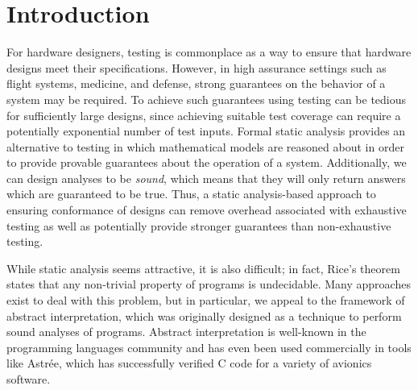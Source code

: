 \documentclass[10pt,conference]{IEEEtran}
\begin{document}




%
\IEEEpeerreviewmaketitle



\section{Introduction}
For hardware designers, testing is commonplace as a way to ensure
that hardware designs meet their specifications. However, in
high assurance settings such as flight systems, medicine, and
defense, strong guarantees on the behavior of a system may be
required. To achieve such guarantees using testing can be tedious
for sufficiently large designs, since achieving suitable test
coverage can require a potentially exponential number of test inputs.
Formal static analysis provides an alternative to testing in which
mathematical models are reasoned about in order to provide provable
guarantees about the operation of a system. Additionally, we can
design analyses to be \emph{sound}, which means that they will only
return answers which are guaranteed to be true. Thus, a static analysis-based 
approach to ensuring conformance of designs can
remove overhead associated with exhaustive testing as well as potentially provide
stronger guarantees than non-exhaustive testing.

While static analysis seems attractive, it is also difficult;
in fact, Rice's theorem states that any non-trivial property of
programs is undecidable. Many approaches exist to deal with this problem,
but in particular, we appeal to the framework of abstract interpretation,
which was originally designed as a technique to perform sound analyses
of programs. Abstract interpretation is well-known in the programming
languages community and has even been used commercially in tools like
{\sc Astr\'ee}, which has successfully verified C code for a variety
of avionics software.
\end{document}
